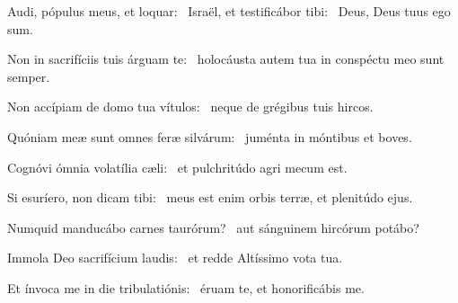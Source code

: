 
\item Audi, pópulus meus, et loquar:~\pscross{} Israël, et testificábor tibi:~\psstar{} Deus, Deus tuus ego sum.

\item Non in sacrifíciis tuis árguam te:~\psstar{} holocáusta autem tua in conspéctu meo sunt semper.

\item Non accípiam de domo tua vítulos:~\psstar{} neque de grégibus tuis hircos.

\item Quóniam meæ sunt omnes feræ silvárum:~\psstar{} juménta in móntibus et boves.

\item Cognóvi ómnia volatília cæli:~\psstar{} et pulchritúdo agri mecum est.

\item Si esuríero, non dicam tibi:~\psstar{} meus est enim orbis terræ, et plenitúdo ejus.

\item Numquid manducábo carnes taurórum?~\psstar{} aut sánguinem hircórum potábo?

\item Immola Deo sacrifícium laudis:~\psstar{} et redde Altíssimo vota tua.

\item Et ínvoca me in die tribulatiónis:~\psstar{} éruam te, et honorificábis me.
